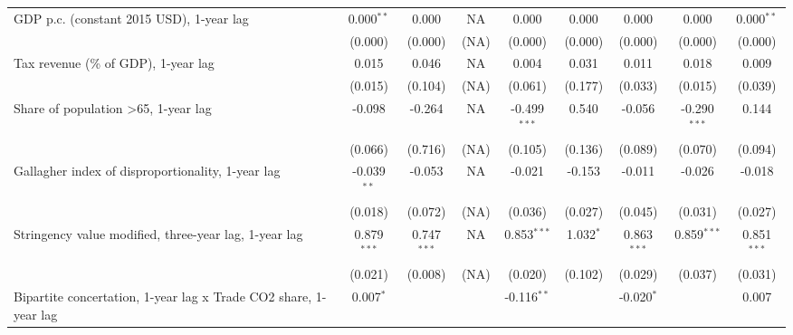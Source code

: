 \begin{table}[htbp]
\begin{tabular}{lcccccccc}
      GDP p.c. (constant 2015 USD), 1-year lag                         & 0.000$^{**}$  & 0.000                     & NA           & 0.000          & 0.000            & 0.000           & 0.000           & 0.000$^{**}$\\   
                                                                       & (0.000)       & (0.000)                   & (NA)         & (0.000)        & (0.000)          & (0.000)         & (0.000)         & (0.000)\\   
      Tax revenue (\% of GDP), 1-year lag                              & 0.015         & 0.046                     & NA           & 0.004          & 0.031            & 0.011           & 0.018           & 0.009\\   
                                                                       & (0.015)       & (0.104)                   & (NA)         & (0.061)        & (0.177)          & (0.033)         & (0.015)         & (0.039)\\   
      Share of population >65, 1-year lag                              & -0.098        & -0.264                    & NA           & -0.499$^{***}$ & 0.540            & -0.056          & -0.290$^{***}$  & 0.144\\   
                                                                       & (0.066)       & (0.716)                   & (NA)         & (0.105)        & (0.136)          & (0.089)         & (0.070)         & (0.094)\\   
      Gallagher index of disproportionality, 1-year lag                & -0.039$^{**}$ & -0.053                    & NA           & -0.021         & -0.153           & -0.011          & -0.026          & -0.018\\   
                                                                       & (0.018)       & (0.072)                   & (NA)         & (0.036)        & (0.027)          & (0.045)         & (0.031)         & (0.027)\\   
      Stringency value modified, three-year lag, 1-year lag            & 0.879$^{***}$ & 0.747$^{***}$             & NA           & 0.853$^{***}$  & 1.032$^{*}$      & 0.863$^{***}$   & 0.859$^{***}$   & 0.851$^{***}$\\   
                                                                       & (0.021)       & (0.008)                   & (NA)         & (0.020)        & (0.102)          & (0.029)         & (0.037)         & (0.031)\\   
      Bipartite concertation, 1-year lag x Trade CO2 share, 1-year lag & 0.007$^{*}$   &                           &              & -0.116$^{**}$  &                  & -0.020$^{*}$    &                 & 0.007\\   

\end{tabular}
\end{table}
